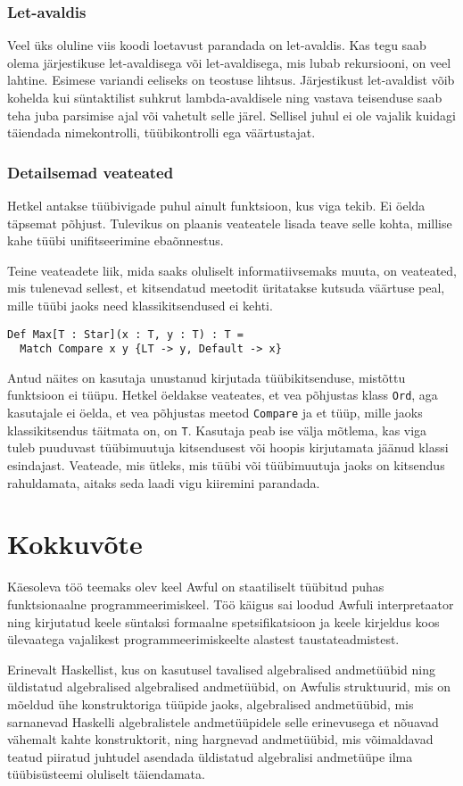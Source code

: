 \documentclass[12pt]{article}
\newcommand\peatykk[1]{
  \clearpage
  \section{#1}}
\begin{document}
      \subsubsection{Let-avaldis}
        Veel üks oluline viis koodi loetavust parandada on let-avaldis. Kas tegu saab olema järjestikuse let-avaldisega või let-avaldisega, mis lubab rekursiooni, on veel lahtine. Esimese variandi eeliseks on teostuse lihtsus. Järjestikust let-avaldist võib kohelda kui süntaktilist suhkrut lambda-avaldisele ning vastava teisenduse saab teha juba parsimise ajal või vahetult selle järel. Sellisel juhul ei ole vajalik kuidagi täiendada nimekontrolli, tüübikontrolli ega väärtustajat.
      \subsubsection{Detailsemad veateated}
        Hetkel antakse tüübivigade puhul ainult funktsioon, kus viga tekib. Ei öelda täpsemat põhjust. Tulevikus on plaanis veateatele lisada teave selle kohta, millise kahe tüübi unifitseerimine ebaõnnestus.

        Teine veateadete liik, mida saaks oluliselt informatiivsemaks muuta, on veateated, mis tulenevad sellest, et kitsendatud meetodit üritatakse kutsuda väärtuse peal, mille tüübi jaoks need klassikitsendused ei kehti.

        \begin{verbatim}Def Max[T : Star](x : T, y : T) : T =
  Match Compare x y {LT -> y, Default -> x}\end{verbatim}

        Antud näites on kasutaja unustanud kirjutada tüübikitsenduse, mistõttu funktsioon ei tüüpu. Hetkel öeldakse veateates, et vea põhjustas klass \verb!Ord!, aga kasutajale ei öelda, et vea põhjustas meetod \verb!Compare! ja et tüüp, mille jaoks klassikitsendus täitmata on, on \verb!T!. Kasutaja peab ise välja mõtlema, kas viga tuleb puuduvast tüübimuutuja kitsendusest või hoopis kirjutamata jäänud klassi esindajast. Veateade, mis ütleks, mis tüübi või tüübimuutuja jaoks on kitsendus rahuldamata, aitaks seda laadi vigu kiiremini parandada.
  \peatykk{Kokkuvõte}
    Käesoleva töö teemaks olev keel Awful on staatiliselt tüübitud puhas funktsionaalne programmeerimiskeel. Töö käigus sai loodud Awfuli interpretaator ning kirjutatud keele süntaksi formaalne spetsifikatsioon ja keele kirjeldus koos ülevaatega vajalikest programmeerimiskeelte alastest taustateadmistest.

    Erinevalt Haskellist, kus on kasutusel tavalised algebralised andmetüübid ning üldistatud algebralised algebralised andmetüübid, on Awfulis struktuurid, mis on mõeldud ühe konstruktoriga tüüpide jaoks, algebralised andmetüübid, mis sarnanevad Haskelli algebralistele andmetüüpidele selle erinevusega et nõuavad vähemalt kahte konstruktorit, ning hargnevad andmetüübid, mis võimaldavad teatud piiratud juhtudel asendada üldistatud algebralisi andmetüüpe ilma tüübisüsteemi oluliselt täiendamata.
\end{document}
